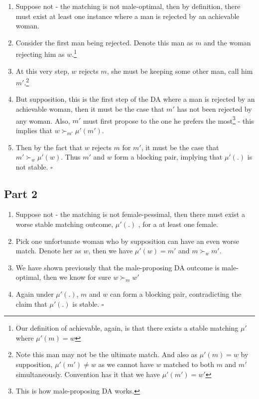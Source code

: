 \documentclass{tufte-handout}
\begin{document}
\begin{enumerate}

    \item Suppose not - the matching is not male-optimal, then by definition, there must exist at least one instance where a man is rejected by an achievable woman. 
    
    \item Consider the first man being rejected. Denote this man as $m$ and the woman rejecting him as $w$.\footnote{Our definition of achievable, again, is that there exists a stable matching $\mu'$ where $\mu'(m) = w$}
    
    \item At this very step, $w$ rejects $m$, she must be keeping some other man, call him $m'$.\footnote{Note this man may not be the ultimate match. And also as $\mu'(m) = w$ by supposition, $\mu'(m') \neq w$ as we cannot have $w$ matched to both $m$ and $m'$ simultaneously. Convention has it that we have $\mu'(m') = w'$}
    
    \item But supposition, this is the first step of the DA where a man is rejected by an achievable woman, then it must be the case that $m'$ has not been rejected by any woman. Also, $m'$ must first propose to the one he prefers the most\footnote{This is how male-proposing DA works.} - this implies that $w \succ_{m'} \mu'(m')$.
    
    \item Then by the fact that $w$ rejects $m$ for $m'$, it must be the case that $m' \succ_{w} \mu'(w)$. Thus $m'$ and $w$ form a blocking pair, implying that $\mu'(.)$ is not stable. $\square$ 
\end{enumerate}

\subsection{Part 2}\label{sec:answer-part-two}

\begin{enumerate}

    \item Suppose not - the matching is not female-pessimal, then there must exist a worse stable matching outcome, $\mu'(.)$ , for a at least one female.
    
    \item Pick one unfortunate woman who by supposition can have an even worse match. Denote her as $w$, then we have $\mu'(w) = m'$ and $m \succ_{w} m'$.
    
    \item We have shown previously that the male-proposing DA outcome is male-optimal, then we know for sure $w \succ_{m} w'$
    
    \item Again under $\mu'(.)$, $m$ and $w$ can form a blocking pair, contradicting the claim that $\mu'(.)$ is stable. $\square$
\end{enumerate}

%
%
\end{document}
